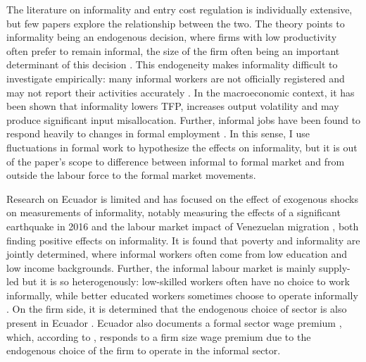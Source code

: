 \documentclass[11pt,a4paper]{article}\usepackage[]{graphicx}\usepackage[]{xcolor}
\begin{document}
The literature on informality and entry cost regulation is individually extensive, but few papers explore the relationship between the two. The theory points to informality being an endogenous decision, where firms with low productivity often prefer to remain informal, the size of the firm often being an important determinant of this decision \parencite{Delechat2020, MauricioPrado.2011, ElianeElBadaoui.2010}. This endogeneity makes informality difficult to investigate empirically: many informal workers are not officially registered and may not report their activities accurately \textcite{Oviedo.2009}. In the macroeconomic context, it has been shown that informality lowers TFP, increases output volatility and may produce significant input misallocation. Further, informal jobs have been found to respond heavily to changes in formal employment \parencite{Leyva.2020}. In this sense, I use fluctuations in formal work to hypothesize the effects on informality, but it is out of the paper's scope to difference between informal to formal market and from outside the labour force to the formal market movements.

Research on Ecuador is limited and has focused on the effect of exogenous shocks on measurements of informality, notably measuring the effects of a significant earthquake in 2016 \parencite{Mendoza.2020} and the labour market impact of Venezuelan migration \parencite{Olivieri.2022}, both finding positive effects on informality. It is found that poverty and informality are jointly determined, where informal workers often come from low education and low income backgrounds. Further, the informal labour market is mainly supply-led but it is so heterogenously: low-skilled workers often have no choice to work informally, while better educated workers sometimes choose to operate informally \parencite{Canelas.2019}. On the firm side, it is determined that the endogenous choice of sector is also present in Ecuador \parencite{Medvedev.2016}. Ecuador also documents a formal sector wage premium \textcite{MacIsaac.1997}, which, according to \textcite{ElianeElBadaoui.2010}, responds to a firm size wage premium due to the endogenous choice of the firm to operate in the informal sector. 
\end{document}
